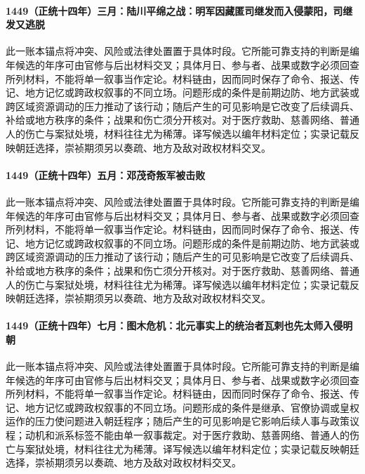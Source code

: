 \paragraph{1449（正统十四年）三月：陆川平绵之战：明军因藏匿司继发而入侵蒙阳，司继发又逃脱} 此一账本锚点将冲突、风险或法律处置置于具体时段。它所能可靠支持的判断是编年候选的年序可由官修与后出材料交叉；具体月日、参与者、战果或数字必须回查所列材料，不能将单一叙事当作定论。材料链由，因而同时保存了命令、报送、传记、地方记忆或跨政权叙事的不同立场。问题形成的条件是前期边防、地方武装或跨区域资源调动的压力推动了该行动；随后产生的可见影响是它改变了后续调兵、补给或地方秩序的条件；战果和伤亡须分开核对。对于医疗救助、慈善网络、普通人的伤亡与案狱处境，材料往往尤为稀薄。译写候选以编年材料定位；实录记载反映朝廷选择，崇祯期须另以奏疏、地方及敌对政权材料交叉。

\paragraph{1449（正统十四年）五月：邓茂奇叛军被击败} 此一账本锚点将冲突、风险或法律处置置于具体时段。它所能可靠支持的判断是编年候选的年序可由官修与后出材料交叉；具体月日、参与者、战果或数字必须回查所列材料，不能将单一叙事当作定论。材料链由，因而同时保存了命令、报送、传记、地方记忆或跨政权叙事的不同立场。问题形成的条件是前期边防、地方武装或跨区域资源调动的压力推动了该行动；随后产生的可见影响是它改变了后续调兵、补给或地方秩序的条件；战果和伤亡须分开核对。对于医疗救助、慈善网络、普通人的伤亡与案狱处境，材料往往尤为稀薄。译写候选以编年材料定位；实录记载反映朝廷选择，崇祯期须另以奏疏、地方及敌对政权材料交叉。

\paragraph{1449（正统十四年）七月：图木危机：北元事实上的统治者瓦剌也先太师入侵明朝} 此一账本锚点将冲突、风险或法律处置置于具体时段。它所能可靠支持的判断是编年候选的年序可由官修与后出材料交叉；具体月日、参与者、战果或数字必须回查所列材料，不能将单一叙事当作定论。材料链由，因而同时保存了命令、报送、传记、地方记忆或跨政权叙事的不同立场。问题形成的条件是继承、官僚协调或皇权运作的压力使问题进入朝廷程序；随后产生的可见影响是它影响后续人事与政策议程；动机和派系标签不能由单一叙事裁定。对于医疗救助、慈善网络、普通人的伤亡与案狱处境，材料往往尤为稀薄。译写候选以编年材料定位；实录记载反映朝廷选择，崇祯期须另以奏疏、地方及敌对政权材料交叉。

